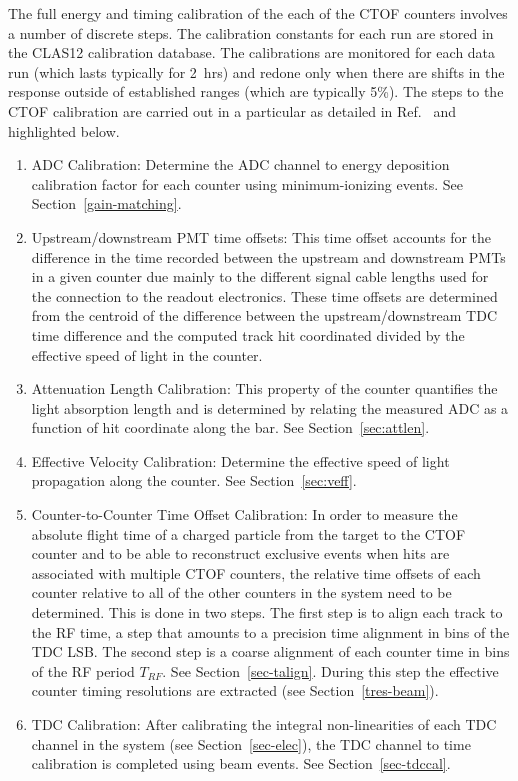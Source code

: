 \documentclass{elsart}
\begin{document}
The full energy and timing calibration of the each of the CTOF counters involves a number of discrete steps. The
calibration constants for each run are stored in the CLAS12 calibration database. The calibrations are monitored
for each data run (which lasts typically for 2~hrs) and redone only when there are shifts in the response outside
of established ranges (which are typically 5\%). The steps to the CTOF calibration are carried out in a particular
as detailed in Ref.~\cite{ctof-calib} and highlighted below.

\begin{enumerate}
\item ADC Calibration: Determine the ADC channel to energy deposition calibration factor for each counter
using minimum-ionizing events. See Section~\ref{gain-matching}.

\item Upstream/downstream PMT time offsets: This time offset accounts for the difference in the time
recorded between the upstream and downstream PMTs in a given counter due mainly to the different
signal cable lengths used for the connection to the readout electronics. These time offsets are determined
from the centroid of the difference between the upstream/downstream TDC time difference and the
computed track hit coordinated divided by the effective speed of light in the counter. 

\item Attenuation Length Calibration: This property of the counter quantifies the light absorption length and
is determined by relating the measured ADC as a function of hit coordinate along the bar. See
Section~\ref{sec:attlen}.

\item Effective Velocity Calibration: Determine the effective speed of light propagation along the counter. See
Section~\ref{sec:veff}.

\item Counter-to-Counter Time Offset Calibration: In order to measure the absolute flight time of a charged
particle from the target to the CTOF counter and to be able to reconstruct exclusive events when hits are
associated with multiple CTOF counters, the relative time offsets of each counter relative to all of the other
counters in the system need to be determined. This is done in two steps. The first step is to align each track
to the RF time, a step that amounts to a precision time alignment in bins of the TDC LSB. The second step is a
coarse alignment of each counter time in bins of the RF period $T_{RF}$. See Section~\ref{sec-talign}. During
this step the effective counter timing resolutions are extracted (see Section~\ref{tres-beam}).

\item TDC Calibration: After calibrating the integral non-linearities of each TDC channel in the system (see
Section~\ref{sec-elec}), the TDC channel to time calibration is completed using beam events. See
Section~\ref{sec-tdccal}.

\end{enumerate}
\end{document}
